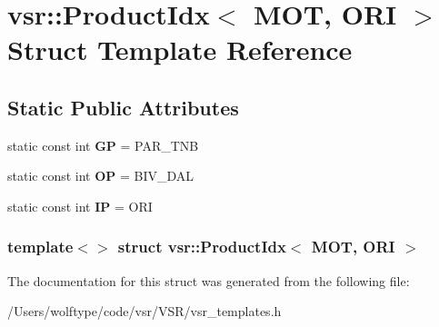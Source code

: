 \hypertarget{structvsr_1_1_product_idx_3_01_m_o_t_00_01_o_r_i_01_4}{\section{vsr\-:\-:Product\-Idx$<$ M\-O\-T, O\-R\-I $>$ Struct Template Reference}
\label{structvsr_1_1_product_idx_3_01_m_o_t_00_01_o_r_i_01_4}
}
\subsection*{Static Public Attributes}
\begin{DoxyCompactItemize}
\item 
\hypertarget{structvsr_1_1_product_idx_3_01_m_o_t_00_01_o_r_i_01_4_a71b7dda915624fdca25ea15fdefd5484}{static const int {\bfseries G\-P} = P\-A\-R\-\_\-\-T\-N\-B}\label{structvsr_1_1_product_idx_3_01_m_o_t_00_01_o_r_i_01_4_a71b7dda915624fdca25ea15fdefd5484}

\item 
\hypertarget{structvsr_1_1_product_idx_3_01_m_o_t_00_01_o_r_i_01_4_ac4067d7e18c5dbec3397410607080bbd}{static const int {\bfseries O\-P} = B\-I\-V\-\_\-\-D\-A\-L}\label{structvsr_1_1_product_idx_3_01_m_o_t_00_01_o_r_i_01_4_ac4067d7e18c5dbec3397410607080bbd}

\item 
\hypertarget{structvsr_1_1_product_idx_3_01_m_o_t_00_01_o_r_i_01_4_a2a9e637b600b2ac10f91b7cd3c2c7585}{static const int {\bfseries I\-P} = O\-R\-I}\label{structvsr_1_1_product_idx_3_01_m_o_t_00_01_o_r_i_01_4_a2a9e637b600b2ac10f91b7cd3c2c7585}

\end{DoxyCompactItemize}
\subsubsection*{template$<$$>$ struct vsr\-::\-Product\-Idx$<$ M\-O\-T, O\-R\-I $>$}



The documentation for this struct was generated from the following file\-:\begin{DoxyCompactItemize}
\item 
/\-Users/wolftype/code/vsr/\-V\-S\-R/vsr\-\_\-templates.\-h\end{DoxyCompactItemize}
